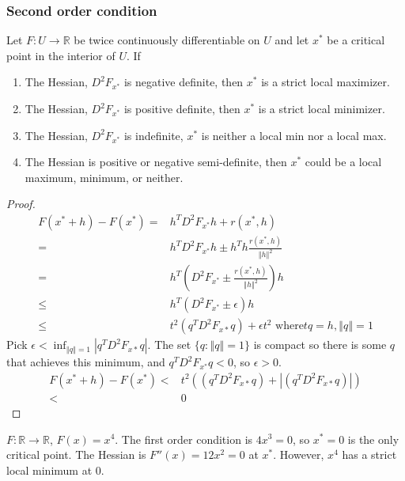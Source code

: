\documentclass[compress]{beamer}
\def\R{\mathbb{R}}
\newcommand{\norm}[1]{\left\Vert {#1} \right\Vert}
\renewcommand{\to}{{\rightarrow}}
\begin{document}
\begin{frame}
  \frametitle{Second order condition}
  \begin{theorem}\label{thm:soc}
    Let $F: U \to \R$ be twice continuously differentiable on $U$ and
    let $x^*$ be a critical point in the interior of $U$. If
    \begin{enumerate}
    \item\label{c:smax} The Hessian, $D^2 F_{x^*}$ is negative definite,
      then $x^*$ is a strict local maximizer.  
    \item The Hessian, $D^2 F_{x^*}$ is positive definite, then $x^*$ is
      a strict local minimizer. 
    \item The Hessian, $D^2 F_{x^*}$ is indefinite, $x^*$ is neither a
      local min nor a local max.
    \item\label{c:ambig} The Hessian is positive or negative
      semi-definite, then $x^*$ could be a local maximum, minimum, or
      neither. 
    \end{enumerate}
  \end{theorem}
\end{frame}


\begin{proof}
  \begin{align*}
    F(x^*+h) - F(x^*) = & h^T D^2 F_{x^*} h + r(x^*,h) \\
    = & h^T D^2 F_{x^*} h \pm h^T h \frac{r(x^*,h)}{\norm{h}^2} \\
    = & 
    h^T \left( D^2 F_{x^*}\pm \frac{r(x^*,h)}{\norm{h}^2} \right) h \\
    \leq & h^T \left( D^2 F_{x^*}\pm \epsilon \right) h \\
    \leq & t^2 (q^T D^2 F_{x*} q) + \epsilon t^2 \text{ where} tq=h, \norm{q}=1
  \end{align*}
  Pick $\epsilon < \inf_{\norm{q} =1} |q^T D^2  F_{x*} q|$. The set
  $\{q: \norm{q} = 1\}$ is compact so there is 
  some $q$ that achieves this minimum, and $q^T D^2 F_{x^*} q < 0$, so
  $\epsilon >0$.
  \begin{align*}
    F(x^*+h) - F(x^*) < & t^2\left((q^T D^2 F_{x*} q) + |(q^T D^2 F_{x*}
      q)|\right) \\
    < & 0
  \end{align*}
\end{proof}

\begin{frame}\begin{example}
    $F:\R \to \R$, $F(x) = x^4$. The first order condition is $4x^3 =
    0$, so $x^* = 0$ is the only critical point. The Hessian is $F''(x)
    = 12x^2 = 0$ at $x^*$. However, $x^4$ has a strict local minimum at
    $0$.
  \end{example}
\end{frame}  
\end{document}
